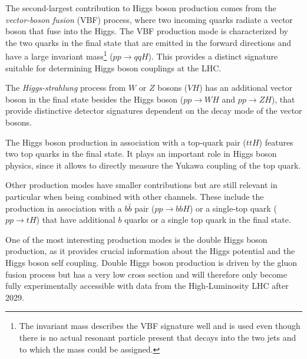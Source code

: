 The second-largest contribution to Higgs boson production comes from the \emph{vector-boson fusion} (VBF) process, where two incoming quarks radiate a vector boson that fuse into the Higgs.
The VBF production mode is characterized by the two quarks in the final state that are emitted in the forward directions and have a large invariant mass\footnote{The invariant mass describes the VBF signature well and is used even though there is no actual resonant particle present that decays into the two jets and to which the mass could be assigned.} ($pp\rightarrow qqH$). This provides a distinct signature suitable for determining Higgs boson couplings at the LHC.

The \emph{Higgs-strahlung} process from $W$ or $Z$ bosons ($VH$) has an additional vector boson in the final state besides the Higgs boson ($pp \rightarrow WH$ and $pp \rightarrow ZH$), that provide distinctive detector signatures dependent on the decay mode of the vector bosons. 

The Higgs boson production in association with a top-quark pair ($ttH$) features two top quarks in the final state. It plays an important role in Higgs boson physics, since it allows to directly measure the Yukawa coupling of the top quark. 

Other production modes have smaller contributions but are still relevant in particular when being combined with other channels.
These include the production in association with a $b\bar{b}$ pair ($pp\rightarrow bbH$) or a single-top quark ($pp \rightarrow tH$) that have additional $b$ quarks or a single top quark in the final state. 

One of the most interesting production modes is the double Higgs boson production, as it provides crucial information about the Higgs potential and the Higgs boson self coupling. Double Higgs boson production is driven by the gluon fusion process but has a very low cross section and will therefore only become fully experimentally accessible with data from the High-Luminosity LHC after 2029. 

